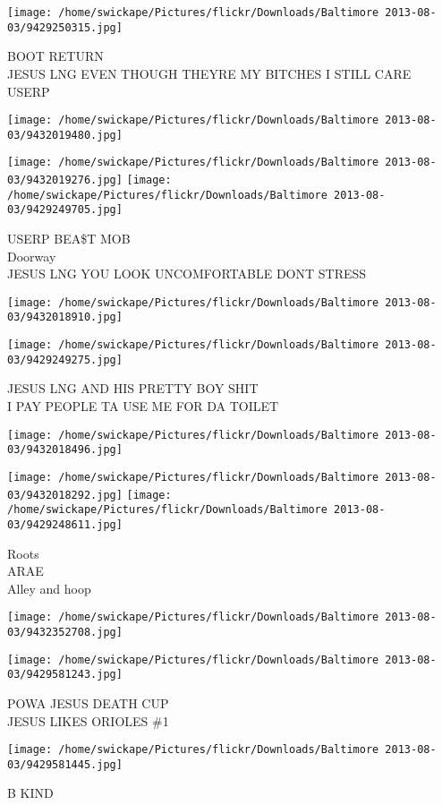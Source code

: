 \documentclass[10pt,letterpaper]{article}
\begin{document}
\vspace{0.25in}
\texttt{[image: /home/swickape/Pictures/flickr/Downloads/Baltimore 2013-08-03/9429250315.jpg]}

BOOT RETURN\\
JESUS LNG EVEN THOUGH THEYRE MY BITCHES I STILL CARE\\
USERP
\pagebreak

\texttt{[image: /home/swickape/Pictures/flickr/Downloads/Baltimore 2013-08-03/9432019480.jpg]}

\vspace{0.25in}
\texttt{[image: /home/swickape/Pictures/flickr/Downloads/Baltimore 2013-08-03/9432019276.jpg]}
\texttt{[image: /home/swickape/Pictures/flickr/Downloads/Baltimore 2013-08-03/9429249705.jpg]}

USERP BEA\$T MOB\\
Doorway\\
JESUS LNG YOU LOOK UNCOMFORTABLE DONT STRESS
\pagebreak

\texttt{[image: /home/swickape/Pictures/flickr/Downloads/Baltimore 2013-08-03/9432018910.jpg]}

\vspace{0.25in}
\texttt{[image: /home/swickape/Pictures/flickr/Downloads/Baltimore 2013-08-03/9429249275.jpg]}

JESUS LNG AND HIS PRETTY BOY SHIT\\
I PAY PEOPLE TA USE ME FOR DA TOILET
\pagebreak

\texttt{[image: /home/swickape/Pictures/flickr/Downloads/Baltimore 2013-08-03/9432018496.jpg]}

\vspace{0.25in}
\texttt{[image: /home/swickape/Pictures/flickr/Downloads/Baltimore 2013-08-03/9432018292.jpg]}
\texttt{[image: /home/swickape/Pictures/flickr/Downloads/Baltimore 2013-08-03/9429248611.jpg]}

Roots\\
ARAE\\
Alley and hoop
\pagebreak

\texttt{[image: /home/swickape/Pictures/flickr/Downloads/Baltimore 2013-08-03/9432352708.jpg]}

\vspace{0.25in}
\texttt{[image: /home/swickape/Pictures/flickr/Downloads/Baltimore 2013-08-03/9429581243.jpg]}

POWA JESUS DEATH CUP\\
JESUS LIKES ORIOLES \#1
\pagebreak

\texttt{[image: /home/swickape/Pictures/flickr/Downloads/Baltimore 2013-08-03/9429581445.jpg]}

B KIND
\pagebreak
\end{document}
